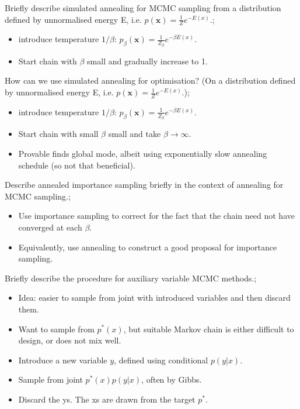 \documentclass{article}
\begin{document}
Briefly describe simulated annealing for MCMC sampling from a distribution defined by unnormalised energy E, i.e. $p(\mathbf{x}) = \frac{1}{Z}e^{-E(x)}$.; \begin{itemize}
    \item introduce temperature $1/\beta$: $p_\beta(\mathbf{x}) = \frac{1}{Z_{\beta}}e^{-\beta E(x)}$.
    \item Start chain with $\beta$ small and gradually increase to 1.
\end{itemize}

How can we use simulated annealing for optimisation? (On a distribution defined by unnormalised energy E, i.e. $p(\mathbf{x}) = \frac{1}{Z}e^{-E(x)}$.); \begin{itemize}
    \item introduce temperature $1/\beta$: $p_\beta(\mathbf{x}) = \frac{1}{Z_{\beta}}e^{-\beta E(x)}$.
    \item Start chain with small $\beta$ small and take $\beta\to \infty$.
    \item Provable finds global mode, albeit using exponentially slow annealing schedule (so not that beneficial).
\end{itemize}

Describe annealed importance sampling briefly in the context of annealing for MCMC sampling.; \begin{itemize}
    \item Use importance sampling to correct for the fact that the chain need not have converged at each $\beta$.
    \item Equivalently, use annealing to construct a good proposal for importance sampling.
\end{itemize}

Briefly describe the procedure for auxiliary variable MCMC methods.; \begin{itemize}
    \item Idea: easier to sample from joint with introduced variables and then discard them.
    \item Want to sample from $p^*(x)$, but suitable Markov chain is either difficult to design, or does not mix well.
    \item Introduce a new variable $y$, defined using conditional $p(y|x)$.
    \item Sample from joint $p^*(x)p(y|x)$, often by Gibbs.
    \item Discard the ys. The xs are drawn from the target $p^*$.
\end{itemize}
\end{document}
